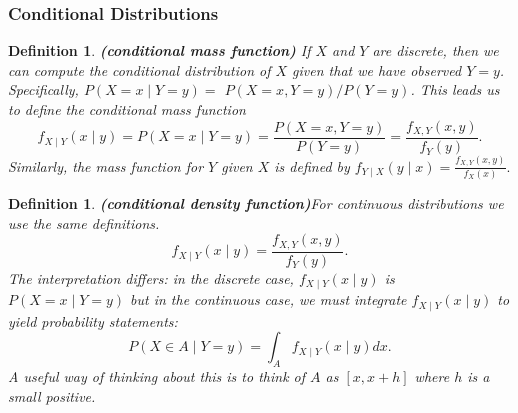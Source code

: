 \documentclass[13pt]{article}
\newtheorem{definition}[theorem]{Definition}
\theoremstyle{definition}
\theoremstyle{remark}
\begin{document}
\subsubsection{Conditional Distributions}
\begin{definition}\textbf{(conditional mass function)}
    If $X$ and $Y$ are discrete, then we can compute the conditional distribution of $X$ given that we have observed $Y=y$. Specifically, $P(X=x \mid Y=y)=$ $P(X=x, Y=y) / P(Y=y)$. This leads us to define the conditional mass function
$$
f_{X \mid Y}(x \mid y)=P(X=x \mid Y=y)=\frac{P(X=x, Y=y)}{P(Y=y)}=\frac{f_{X, Y}(x, y)}{f_{Y}(y)} .
$$
Similarly, the mass function for $Y$ given $X$ is defined by $f_{Y \mid X}(y \mid x)=\frac{f_{X, Y}(x, y)}{f_{X}(x)}.$
\end{definition}

\begin{definition}\textbf{(conditional density function)}For continuous distributions we use the same definitions. 
$$
f_{X \mid Y}(x \mid y)=\frac{f_{X, Y}(x, y)}{f_{Y}(y)} .
$$
The interpretation differs: in the discrete case, $f_{X \mid Y}(x \mid y)$ is $P(X=x \mid Y=y)$ but in the continuous case, we must integrate $f_{X \mid Y}(x \mid y)$ to yield probability statements:
$$
P(X \in A \mid Y=y)=\int_{A} f_{X \mid Y}(x \mid y) d x .
$$
A useful way of thinking about this is to think of $A$ as $[x, x+h]$ where $h$ is a small positive.
\end{definition}
\end{document}
